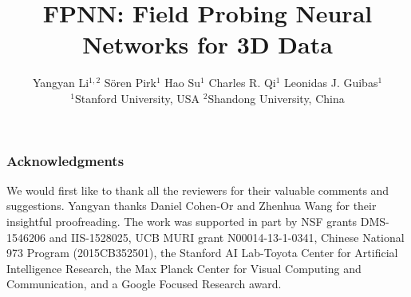\documentclass{article}
\title{FPNN: Field Probing Neural Networks for 3D Data}
\author{
	Yangyan Li$^{1,2}$ \hspace{0.1in}
	S\"oren Pirk$^{1}$ \hspace{0.1in}
	Hao Su$^{1}$ \hspace{0.1in}
	Charles R. Qi$^{1}$ \hspace{0.1in}
	Leonidas J. Guibas$^{1}$ \vspace{0.05in} \\
	$^{1}$Stanford University, USA \hspace{0.4in} $^{2}$Shandong University, China
	\vspace{-0.2cm}
}
\begin{document}
	
\maketitle

\vspace{-0.6cm}

\vspace{-0.6cm}

\vspace{-0.3cm}

\vspace{-0.3cm}


\vspace{-0.2cm}

\vspace{-0.2cm}
\subsubsection*{Acknowledgments}
\vspace{-0.2cm}
We would first like to thank all the reviewers for their valuable comments and suggestions. Yangyan thanks Daniel Cohen-Or and Zhenhua Wang for their insightful proofreading. The work was supported in part by NSF grants DMS-1546206 and IIS-1528025, UCB MURI grant N00014-13-1-0341, Chinese National 973 Program (2015CB352501), the Stanford AI Lab-Toyota Center for Artificial Intelligence Research, the Max Planck Center for Visual Computing and Communication, and a Google Focused Research award.



\end{document}
